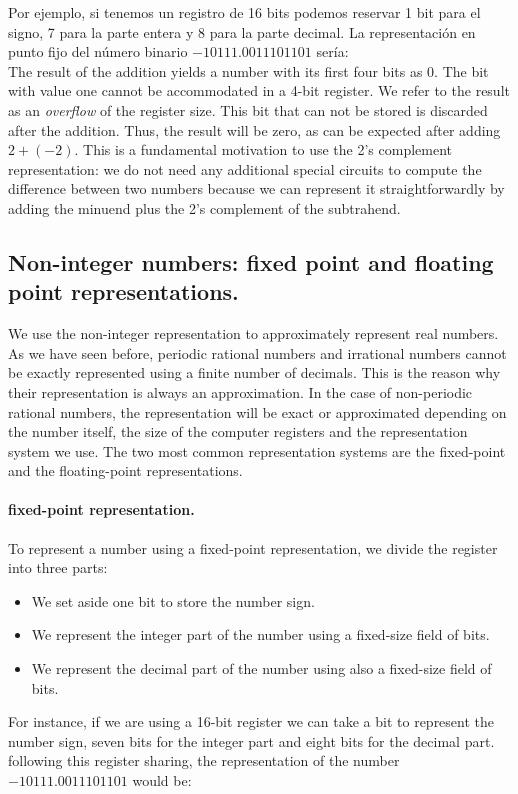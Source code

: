 \begin{paracol}{2}
Por ejemplo, si tenemos un registro de 16 bits podemos reservar 1 bit para el signo, 7 para la parte entera y 8 para la parte decimal.  La representación en punto fijo del número binario $-10111.0011101101$ sería: \\
\switchcolumn
The result of the addition yields a number with its first four bits as 0. The bit with value one cannot be accommodated in a 4-bit register. We refer to the result as an \emph{overflow} of the register size. This bit that can not be stored is discarded after the addition. Thus, the result will be zero, as can be expected after adding $2+(-2)$. This is a fundamental motivation to use the 2's complement representation: we do not need any additional special circuits to compute the difference between two numbers because we can represent it straightforwardly by adding the minuend plus the 2's complement of the subtrahend. 
\subsection{Non-integer numbers: fixed point and floating point representations.}We use the non-integer representation to approximately represent real numbers. As we have seen before, periodic rational numbers and irrational numbers cannot be exactly represented using a finite number of decimals. This is the reason why their representation is always an approximation. In the case of non-periodic rational numbers, the representation will be exact or approximated depending on the number itself, the size of the computer registers and the representation system we use. The two most common representation systems are the fixed-point and the floating-point representations.   \paragraph{fixed-point representation.} To represent a number using a fixed-point representation, we divide the register into three parts:
\begin{itemize}
    \item We set aside one bit to store the number sign.
    \item We represent the integer part of the number using a fixed-size field of bits.
    \item We represent the decimal part of the number using also a fixed-size field of bits. 
 \end{itemize}
 For instance, if we are using a 16-bit register we can take a bit to represent the number sign, seven bits for the integer part and eight bits for the decimal part. following this register sharing, the representation of the number $-10111.0011101101$ would be:\\ 
\end{paracol}
